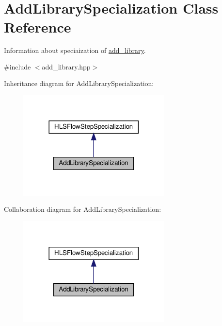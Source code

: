 \hypertarget{classAddLibrarySpecialization}{}\section{Add\+Library\+Specialization Class Reference}
\label{classAddLibrarySpecialization}


Information about speciaization of \hyperlink{classadd__library}{add\+\_\+library}.  




{\ttfamily \#include $<$add\+\_\+library.\+hpp$>$}



Inheritance diagram for Add\+Library\+Specialization\+:
\nopagebreak
\begin{figure}[H]
\begin{center}
\leavevmode
\includegraphics[width=218pt]{df/dfe/classAddLibrarySpecialization__inherit__graph}
\end{center}
\end{figure}


Collaboration diagram for Add\+Library\+Specialization\+:
\nopagebreak
\begin{figure}[H]
\begin{center}
\leavevmode
\includegraphics[width=218pt]{df/d1b/classAddLibrarySpecialization__coll__graph}
\end{center}
\end{figure}
